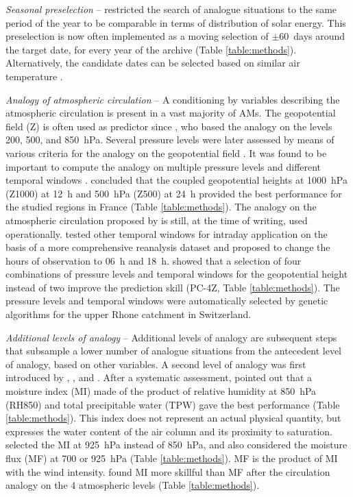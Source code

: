 \documentclass[review]{elsarticle}
\begin{document}
\textit{Seasonal preselection} -- \citet{Lorenz1969} restricted the search of analogue situations to the same period of the year to be comparable in terms of distribution of solar energy. This preselection is now often implemented as a moving selection of $\pm$60~days around the target date, for every year of the archive (Table \ref{table:methods}). Alternatively, the candidate dates can be selected based on similar air temperature \citep{BenDaoud2016}.

\textit{Analogy of atmospheric circulation} -- A conditioning by variables describing the atmospheric circulation is present in a vast majority of AMs. The geopotential field (Z) is often used as predictor since \citet{Lorenz1969}, who based the analogy on the levels 200, 500, and 850~hPa. Several pressure levels were later assessed by means of various criteria for the analogy on the geopotential field \citep{Duband1970, Duband1974, Duband1981, Guilbaud1997}. It was found to be important to compute the analogy on multiple pressure levels and different temporal windows \citep{Guilbaud1998, Obled2002}. \citet{Bontron2004} concluded that the coupled geopotential heights at 1000~hPa (Z1000) at 12~h and 500~hPa (Z500) at 24~h provided the best performance \citep[for a subset of the NCEP/NCAR Reanalysis I;][]{Kalnay1996, Kistler2001} for the studied regions in France (Table \ref{table:methods}). The analogy on the atmospheric circulation proposed by \citet{Bontron2004} is still, at the time of writing, used operationally. \citet{Marty2010} tested other temporal windows for intraday application on the basis of a more comprehensive reanalysis dataset and proposed to change the hours of observation to 06~h and 18~h. \citet{Horton2018a} showed that a selection of four combinations of pressure levels and temporal windows for the geopotential height instead of two improve the prediction skill (PC-4Z, Table \ref{table:methods}). The pressure levels and temporal windows were automatically selected by genetic algorithms for the upper Rhone catchment in Switzerland.

\textit{Additional levels of analogy} -- Additional levels of analogy are subsequent steps that subsample a lower number of analogue situations from the antecedent level of analogy, based on other variables. A second level of analogy was first introduced by \citet{Mandon1985}, \citet{Vallee1986}, and \citet{Gibergans-Baguena2007}. After a systematic assessment, \citet{Bontron2004} pointed out that a moisture index (MI) made of the product of relative humidity at 850~hPa (RH850) and total precipitable water (TPW) gave the best performance (Table \ref{table:methods}). This index does not represent an actual physical quantity, but expresses the water content of the air column and its proximity to saturation. \citet{Marty2010} selected the MI at 925~hPa instead of 850~hPa, and also considered the moisture flux (MF) at 700 or 925~hPa (Table \ref{table:methods}). MF is the product of MI with the wind intensity. \citet{Horton2018a} found MI more skillful than MF after the circulation analogy on the 4 atmospheric levels (Table \ref{table:methods}).
\end{document}
